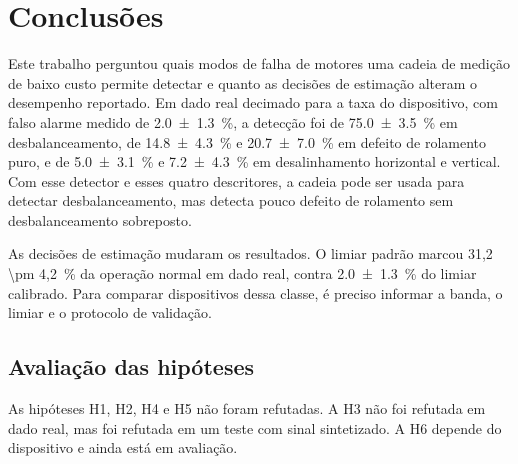 
\makeatletter
{}
\makeatother

\chapter{Conclusões}
\label{cap:conclusoes}

Este trabalho perguntou quais modos de falha de motores uma cadeia de medição de baixo custo
permite detectar e quanto as decisões de estimação alteram o desempenho reportado. Em dado
real decimado para a taxa do dispositivo, com falso alarme medido de \SI{2,0 \pm 1,3}{\percent},
a detecção foi de \SI{75,0 \pm 3,5}{\percent} em desbalanceamento, de \SI{14,8 \pm 4,3}{\percent}
e \SI{20,7 \pm 7,0}{\percent} em defeito de rolamento puro, e de \SI{5,0 \pm 3,1}{\percent} e
\SI{7,2 \pm 4,3}{\percent} em desalinhamento horizontal e vertical. Com esse detector e esses
quatro descritores, a cadeia pode ser usada para detectar desbalanceamento, mas detecta pouco
defeito de rolamento sem desbalanceamento sobreposto.

As decisões de estimação mudaram os resultados. O limiar padrão marcou \SI{31,2 \pm
4,2}{\percent} da operação normal em dado real, contra \SI{2,0 \pm 1,3}{\percent} do limiar
calibrado. Para comparar dispositivos dessa classe, é preciso informar a banda, o limiar e o
protocolo de validação.

\section{Avaliação das hipóteses}
\label{sec:conc-hipoteses}

As hipóteses H1, H2, H4 e H5 não foram refutadas. A H3 não foi refutada em dado real, mas foi
refutada em um teste com sinal sintetizado. A H6 depende do dispositivo e ainda está em avaliação.

